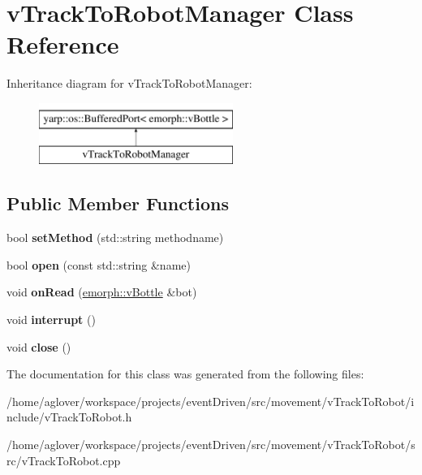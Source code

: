 \hypertarget{classvTrackToRobotManager}{\section{v\-Track\-To\-Robot\-Manager Class Reference}
\label{classvTrackToRobotManager}
}
Inheritance diagram for v\-Track\-To\-Robot\-Manager\-:\begin{figure}[H]
\begin{center}
\leavevmode
\includegraphics[height=2.000000cm]{classvTrackToRobotManager}
\end{center}
\end{figure}
\subsection*{Public Member Functions}
\begin{DoxyCompactItemize}
\item 
\hypertarget{classvTrackToRobotManager_ae3a3a2b0145f05c001169efa52c9a101}{bool {\bfseries set\-Method} (std\-::string methodname)}\label{classvTrackToRobotManager_ae3a3a2b0145f05c001169efa52c9a101}

\item 
\hypertarget{classvTrackToRobotManager_acd829a9e8130d24812666a2738926468}{bool {\bfseries open} (const std\-::string \&name)}\label{classvTrackToRobotManager_acd829a9e8130d24812666a2738926468}

\item 
\hypertarget{classvTrackToRobotManager_a96a625860ae11797ed9506f53b9f70f2}{void {\bfseries on\-Read} (\hyperlink{classemorph_1_1vBottle}{emorph\-::v\-Bottle} \&bot)}\label{classvTrackToRobotManager_a96a625860ae11797ed9506f53b9f70f2}

\item 
\hypertarget{classvTrackToRobotManager_a3d413d0808aeef12be32541cd2e892ed}{void {\bfseries interrupt} ()}\label{classvTrackToRobotManager_a3d413d0808aeef12be32541cd2e892ed}

\item 
\hypertarget{classvTrackToRobotManager_a2d43766cdec75aa97d064276c17ee81c}{void {\bfseries close} ()}\label{classvTrackToRobotManager_a2d43766cdec75aa97d064276c17ee81c}

\end{DoxyCompactItemize}


The documentation for this class was generated from the following files\-:\begin{DoxyCompactItemize}
\item 
/home/aglover/workspace/projects/event\-Driven/src/movement/v\-Track\-To\-Robot/include/v\-Track\-To\-Robot.\-h\item 
/home/aglover/workspace/projects/event\-Driven/src/movement/v\-Track\-To\-Robot/src/v\-Track\-To\-Robot.\-cpp\end{DoxyCompactItemize}
